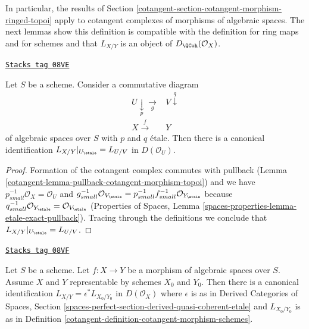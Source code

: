 In particular, the results of
Section \ref{cotangent-section-cotangent-morphism-ringed-topoi} apply
to cotangent complexes of morphisms of algebraic spaces.
The next lemmas show this definition is compatible with the definition
for ring maps and for schemes and that $L_{X/Y}$ is an
object of $D_\QCoh(\mathcal{O}_X)$.

\begin{lemma}
\label{cotangent-lemma-etale-localization}
\href{https://stacks.math.columbia.edu/tag/08VE}{\texttt{Stacks tag 08VE}}

Let $S$ be a scheme. Consider a commutative diagram
$$
\begin{array}{cc}U \underset{p}{\downarrow}\underset{g}{\longrightarrow} & V \overset{q}{\downarrow} \\ X \overset{f}{\longrightarrow} & Y\end{array}
$$
of algebraic spaces over $S$ with $p$ and $q$ \'etale.
Then there is a canonical identification
$L_{X/Y}|_{U_\etale} = L_{U/V}$ in $D(\mathcal{O}_U)$.
\end{lemma}

\begin{proof}

Formation of the cotangent complex commutes with pullback
(Lemma \ref{cotangent-lemma-pullback-cotangent-morphism-topoi}) and
we have $p_{small}^{-1}\mathcal{O}_X = \mathcal{O}_U$ and
$g_{small}^{-1}\mathcal{O}_{V_\etale} =
p_{small}^{-1}f_{small}^{-1}\mathcal{O}_{Y_\etale}$
because $q_{small}^{-1}\mathcal{O}_{Y_\etale} =
\mathcal{O}_{V_\etale}$
(Properties of Spaces, Lemma
\ref{spaces-properties-lemma-etale-exact-pullback}).
Tracing through the definitions we conclude that
$L_{X/Y}|_{U_\etale} = L_{U/V}$.
\end{proof}

\begin{lemma}
\label{cotangent-lemma-compare-spaces-schemes}
\href{https://stacks.math.columbia.edu/tag/08VF}{\texttt{Stacks tag 08VF}}

Let $S$ be a scheme. Let $f : X \to Y$ be a morphism of algebraic spaces
over $S$. Assume $X$ and $Y$ representable by schemes $X_0$ and $Y_0$.
Then there is a canonical identification
$L_{X/Y} = \epsilon^*L_{X_0/Y_0}$ in $D(\mathcal{O}_X)$
where $\epsilon$ is as in Derived Categories of Spaces, Section
\ref{spaces-perfect-section-derived-quasi-coherent-etale}
and $L_{X_0/Y_0}$ is as in
 Definition \ref{cotangent-definition-cotangent-morphism-schemes}.
\end{lemma}

